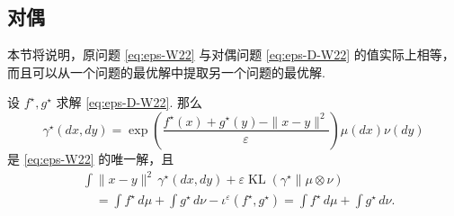 \subsection{对偶}\label{sec:4.2}
本节将说明，原问题 \eqref{eq:eps-W22} 与对偶问题 \eqref{eq:eps-D-W22} 的值实际上相等，而且可以从一个问题的最优解中提取另一个问题的最优解.
\begin{proposition}\label{prop:4.3}
设 $f^\star,g^\star$ 求解 \eqref{eq:eps-D-W22}. 那么
\begin{equation}\label{eq:4.6}
\gamma^\star(dx,dy)=\exp\left(\frac{f^\star(x)+g^\star(y)-\|x-y\|^2}{\varepsilon}\right)\mu(dx)\nu(dy)
\end{equation}
是 \eqref{eq:eps-W22} 的唯一解，且
$$\begin{aligned}
&\int\|x-y\|^2\,\gamma^\star(dx,dy)+\varepsilon\operatorname{KL}(\gamma^\star\|\mu\otimes\nu)\\
&\quad=\int f^\star\,d\mu+\int g^\star\,d\nu-\iota^\varepsilon(f^\star,g^\star)
=\int f^\star\,d\mu+\int g^\star\,d\nu.
\end{aligned}$$
\end{proposition}
